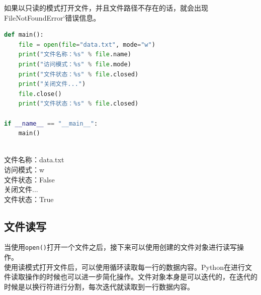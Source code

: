 如果以只读的模式打开文件，并且文件路径不存在的话，就会出现FileNotFoundError`错误信息。

\begin{lstlisting}[language=Python, title=文件操作]
def main():
    file = open(file="data.txt", mode="w")
    print("文件名称：%s" % file.name)
    print("访问模式：%s" % file.mode)
    print("文件状态：%s" % file.closed)
    print("关闭文件...")
    file.close()
    print("文件状态：%s" % file.closed)

if __name__ == "__main__":
    main()
\end{lstlisting}

\begin{tcolorbox}
	 \\
	文件名称：data.txt \\
	访问模式：w \\
	文件状态：False \\
	关闭文件... \\
	文件状态：True
\end{tcolorbox}

\subsection{文件读写}

当使用\lstinline|open()|打开一个文件之后，接下来可以使用创建的文件对象进行读写操作。 \\

使用读模式打开文件后，可以使用循环读取每一行的数据内容。Python在进行文件读取操作的时候也可以进一步简化操作。文件对象本身是可以迭代的，在迭代的时候是以换行符进行分割，每次迭代就读取到一行数据内容。

